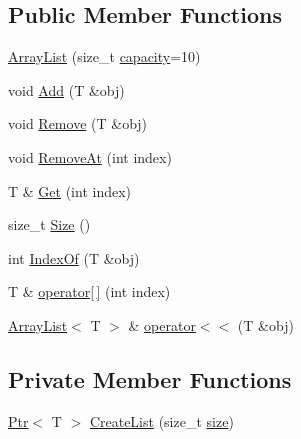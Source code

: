 \subsection*{Public Member Functions}
\begin{DoxyCompactItemize}
\item 
\mbox{\hyperlink{classpdl_1_1collection_1_1_array_list_aa535c7a760f1ddf3c476825033adf7d0}{Array\+List}} (size\+\_\+t \mbox{\hyperlink{classpdl_1_1collection_1_1_array_list_a26805e3d3d40d6c2fcdf1f033e06c94b}{capacity}}=10)
\item 
void \mbox{\hyperlink{classpdl_1_1collection_1_1_array_list_a9ac94f5b260417c6c68ef991967f3f2a}{Add}} (T \&obj)
\item 
void \mbox{\hyperlink{classpdl_1_1collection_1_1_array_list_afceee9863bff0ff905fefcaf8d8f97bc}{Remove}} (T \&obj)
\item 
void \mbox{\hyperlink{classpdl_1_1collection_1_1_array_list_a31a8f4b680ac3fecf7d682d3b6bbac05}{Remove\+At}} (int index)
\item 
T \& \mbox{\hyperlink{classpdl_1_1collection_1_1_array_list_a121f4e45e4278418b449df224791cca2}{Get}} (int index)
\item 
size\+\_\+t \mbox{\hyperlink{classpdl_1_1collection_1_1_array_list_a8003d510edf00a21b01aa28bdfcd6198}{Size}} ()
\item 
int \mbox{\hyperlink{classpdl_1_1collection_1_1_array_list_adea457c92c7bb5a31c245a934f60bacb}{Index\+Of}} (T \&obj)
\item 
T \& \mbox{\hyperlink{classpdl_1_1collection_1_1_array_list_aa30db33a42a00a068815ce835bd66bc7}{operator\mbox{[}$\,$\mbox{]}}} (int index)
\item 
\mbox{\hyperlink{classpdl_1_1collection_1_1_array_list}{Array\+List}}$<$ T $>$ \& \mbox{\hyperlink{classpdl_1_1collection_1_1_array_list_a01d5af65852b81f0ed40b1ba25e965d5}{operator$<$$<$}} (T \&obj)
\end{DoxyCompactItemize}
\subsection*{Private Member Functions}
\begin{DoxyCompactItemize}
\item 
\mbox{\hyperlink{classpdl_1_1memory_1_1_ptr}{Ptr}}$<$ T $>$ \mbox{\hyperlink{classpdl_1_1collection_1_1_array_list_af5143925fb3985ae181e823fde0ac6a0}{Create\+List}} (size\+\_\+t \mbox{\hyperlink{classpdl_1_1collection_1_1_array_list_a3406722503a3df38feb4fbfee18c25d0}{size}})
\end{DoxyCompactItemize}
